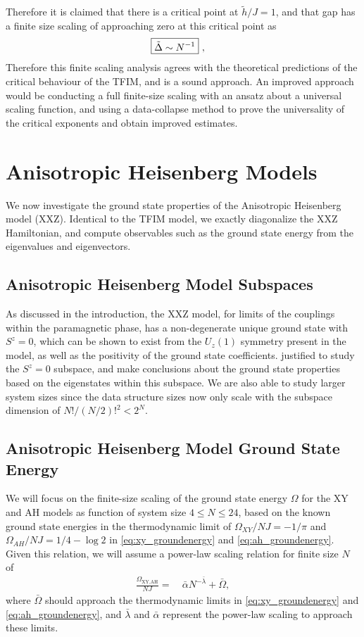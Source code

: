 \documentclass[12pt]{article}{}
\begin{document}
Therefore it is claimed that there is a critical point at $\tilde{h}/J = 1$, and that gap has a finite size scaling of approaching zero at this critical point as
\begin{align}
  \Aboxed{\tilde{\Delta} \sim N^{-1}}~, \label{eq:ising_criticalscaling}
\end{align}
Therefore this finite scaling analysis agrees with the theoretical predictions of the critical behaviour of the TFIM, and is a sound approach. An improved approach would be conducting a full finite-size scaling with an ansatz about a universal scaling function, and using a data-collapse method to prove the universality of the critical exponents and obtain improved estimates.

\newpage
\section{Anisotropic Heisenberg Models}
We now investigate the ground state properties of the Anisotropic Heisenberg model (XXZ). Identical to the TFIM model, we exactly diagonalize the XXZ Hamiltonian, and compute observables such as the ground state energy from the eigenvalues and eigenvectors. 

\subsection{Anisotropic Heisenberg Model Subspaces}
As discussed in the introduction, the XXZ model, for limits of the couplings within the paramagnetic phase, has a non-degenerate unique ground state with $S^{z} = 0$, which can be shown to exist from the $U_z(1)$ symmetry present in the model, as well as the positivity of the ground state coefficients. justified to study the $S^{z} = 0$ subspace, and make conclusions about the ground state properties based on the eigenstates within this subspace. We are also able to study larger system sizes since the data structure sizes now only scale with the subspace dimension of $N!/(N/2)!^2 < 2^N$.

\subsection{Anisotropic Heisenberg Model Ground State Energy}
We will focus on the finite-size scaling of the ground state energy $\Omega$ for the XY and AH models as function of system size $4 \leq N \leq 24$, based on the known ground state energies in the thermodynamic limit of $\Omega_{XY}/{NJ} = -1/\pi$ and $\Omega_{AH}/{NJ} = 1/4 - \log2$ in \cref{eq:xy_groundenergy} and \cref{eq:ah_groundenergy}. Given this relation, we will assume a power-law scaling relation for finite size $N$ of
\begin{align}
  \frac{\Omega_{\textrm{XY,AH}}}{NJ} =&~ \bar{\alpha} N^{-\bar{\lambda}} + \bar{\Omega}, \label{eq:xyah_energyscaling}
\end{align}
where $\bar{\Omega}$ should approach the thermodynamic limits in \cref{eq:xy_groundenergy} and \cref{eq:ah_groundenergy}, and $\bar{\lambda}$ and $\bar{\alpha}$ represent the power-law scaling to approach these limits.
\end{document}
